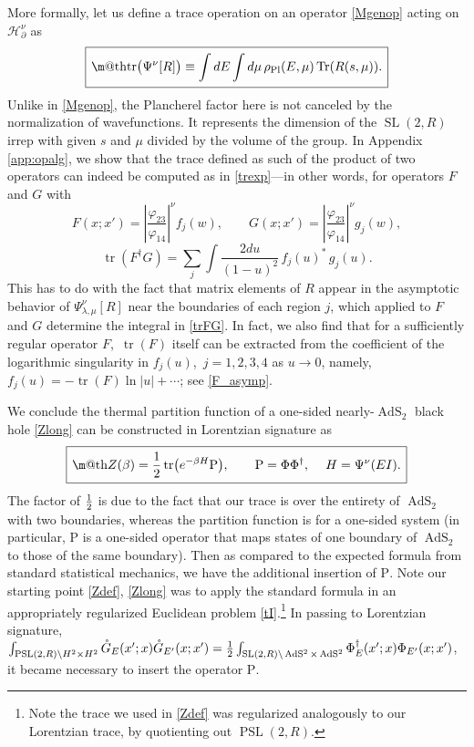 \documentclass[11pt]{article}
\makeatletter
\newcommand{\be}{\begin{equation}}
\newcommand{\ee}{\end{equation}}
\newcommand*{\wideboxed}[1]{\setlength{\fboxsep}{1ex}%
  \fbox{\m@th$\displaystyle#1$}}
\newcommand{\vp}{\varphi}
\newcommand{\RR}{\mathbb{R}}
\DeclareMathOperator{\tr}{tr}
\DeclareMathOperator{\Tr}{Tr}
\DeclareMathOperator{\PSL}{PSL}
\DeclareMathOperator{\tSL}{\widetilde{\mathrm{SL}}}
\DeclareMathOperator{\tAdS}{\widetilde{AdS}}
\DeclareMathOperator{\HH}{H}
\newcommand{\rPl}{\rho_{\text{Pl}}}
\newcommand{\Rho}{\mathrm{P}}
\newcommand{\lam}{\lambda}
\newcommand{\ov}{\over}
\newcommand{\p}{\partial}
\def\widetilde#1{#1}%
\def\HH{H}
\def\RR{R}
\makeatother
\begin{document}
More formally, let us define a trace operation on an operator \eqref{Mgenop} acting on $\mathcal{H}^{\nu}_{\p}$ as
\be \label{M_tr_def}
\wideboxed{
\tr\bigl(\Psi^{\nu}[R]\bigr)
\equiv\int dE \int d\mu\,\rPl(E,\mu)\Tr(R(s,\mu)).}
\ee
Unlike in \eqref{Mgenop}, the Plancherel factor here is not canceled by the normalization of wavefunctions. It represents the dimension of the $\tSL(2,\RR)$ irrep with given $s$ and $\mu$ divided by the volume of the group. In Appendix \ref{app:opalg}, we show that the trace defined as such of the product of two operators can indeed be computed as in \eqref{trexp}---in other words, for operators $F$ and $G$ with
\begin{equation}
F(x;x')=\left|\frac{\vp_{23}}{\vp_{14}}\right|^{\nu}f_j(w),\qquad
G(x;x')=\left|\frac{\vp_{23}}{\vp_{14}}\right|^{\nu}g_j(w),
\end{equation}
\be \label{trFG}
\tr(F^{\dagger}G)=\sum_{j}\int \frac{2du}{(1-u)^2}\,f_j(u)^{*}\,g_j(u).
\ee
This has to do with the fact that matrix elements of $R$ appear in the asymptotic behavior of $\Psi^{\nu}_{\lam, \mu}[R]$ near the boundaries of each region $j$, which applied to $F$ and $G$ determine the integral in \eqref{trFG}. In fact, we also find that for a sufficiently regular operator $F$,\, $\tr(F)$ itself can be extracted from the coefficient of the logarithmic singularity in $f_{j}(u)$,\, $j=1,2,3,4$ as $u \to 0$, namely, $f_j(u) =-\tr (F) \ln |u|+\cdots$; see \eqref{F_asymp}.

We conclude the thermal partition function of a one-sided nearly-$\tAdS_2$ black hole \eqref{Zlong} can be constructed in Lorentzian signature as
\be \label{LorZ}
\wideboxed{
Z(\beta)={1 \ov 2}\tr\bigl(e^{-\beta H}\Rho\bigr), \qquad
\Rho=\Phi \Phi^{\dagger},\quad\: H=\Psi^{\nu}(EI).
}
\ee 
The factor of ${1 \ov 2}$ is due to the fact that our trace is over the entirety of $\tAdS_2$ with two boundaries, whereas the partition function is for a one-sided system (in particular, $\Rho$ is a one-sided operator that maps states of one boundary of $\tAdS_2$ to those of the same boundary). Then as compared to the expected formula from standard statistical mechanics, we have the additional insertion of $\Rho$. Note our starting point \eqref{Zdef}, \eqref{Zlong} was to apply the standard formula in an appropriately regularized Euclidean problem \eqref{tI}.\footnote{Note the trace we used in \eqref{Zdef} was regularized analogously to our Lorentzian trace, by quotienting out $\PSL(2,\RR)$.} In passing to Lorentzian signature, $\int_{\PSL(2,\RR)\backslash\HH^2 \times \HH^2} \mathring{G}_E(x';x)\mathring{G}_{E'}(x;x')={1 \ov 2}\int_{\tSL(2,\RR)\backslash \tAdS^2 \times \tAdS^2}\Phi^{\dagger}_{E}(x';x)\Phi_{E'}(x;x')$, it became necessary to insert the operator $\Rho$. 
\end{document}
